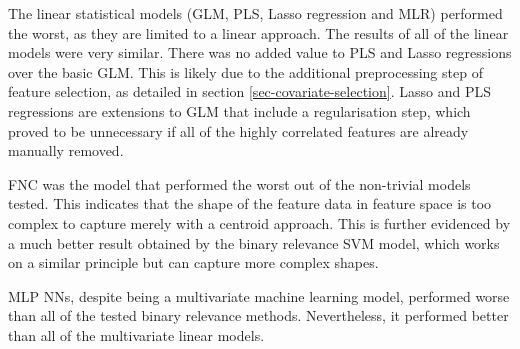 \documentclass[review,authoryear,3p]{elsarticle}
\begin{document}
The linear statistical models (\gls{GLM}, \gls{PLS}, Lasso regression and \gls{MLR}) performed the worst, as they are limited to a linear approach.
The results of all of the linear models were very similar.
There was no added value to \gls{PLS} and Lasso regressions over the basic \gls{GLM}.
This is likely due to the additional preprocessing step of feature selection, as detailed in section \ref{sec-covariate-selection}.
Lasso and \gls{PLS} regressions are extensions to \gls{GLM} that include a regularisation step, which proved to be unnecessary if all of the highly correlated features are already manually removed.

\Gls{FNC} was the model that performed the worst out of the non-trivial models tested.
This indicates that the shape of the feature data in feature space is too complex to capture merely with a centroid approach.
This is further evidenced by a much better result obtained by the binary relevance \gls{SVM} model, which works on a similar principle but can capture more complex shapes.

\Gls{MLP} \glspl{NN}, despite being a multivariate machine learning model, performed worse than all of the tested binary relevance methods.
Nevertheless, it performed better than all of the multivariate linear models.

\end{document}
